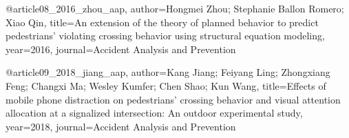 @article{08_2016_zhou_aap,
  author={Hongmei Zhou; Stephanie Ballon Romero; Xiao Qin},
  title={An extension of the theory of planned behavior to predict pedestrians' violating crossing behavior using structural equation modeling},
  year={2016},
  journal={Accident Analysis and Prevention}
}

@article{09_2018_jiang_aap,
  author={Kang Jiang; Feiyang Ling; Zhongxiang Feng; Changxi Ma; Wesley Kumfer; Chen Shao; Kun Wang},
  title={Effects of mobile phone distraction on pedestrians' crossing behavior and visual attention allocation at a signalized intersection: An outdoor experimental study},
  year={2018},
  journal={Accident Analysis and Prevention}
}